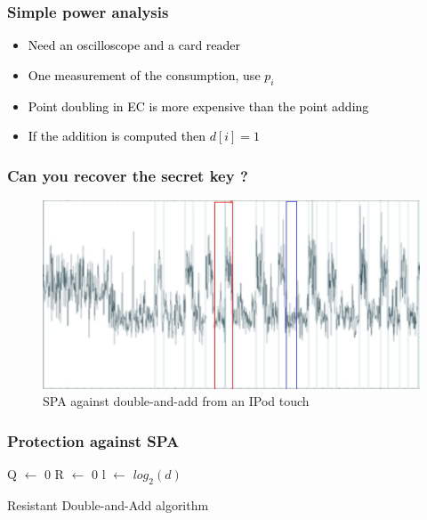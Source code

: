 \documentclass{beamer}
\begin{document}
\begin{frame}
    \frametitle{Simple power analysis}
    \begin{itemize}
        \item \textcolor{black} {Need an oscilloscope and a card reader}
	\item \textcolor{black} {One measurement of the consumption, use $p_{i}$} 
	\item \textcolor{black} {Point doubling in EC is more expensive than the point adding} 
	\item \textcolor{black} {If the addition is computed then $d[i] = 1$}
    \end{itemize}
\end{frame}

\begin{frame}
    \frametitle{Can you recover the secret key ?}
    \begin{figure}
        \centering
        \includegraphics[scale=0.6]{img/spa.png}
        \caption{SPA against double-and-add from an IPod touch}
    \end{figure}
\end{frame}

\begin{frame}
    \frametitle{Protection against SPA}
\begin{algorithm}[H]
    \footnotesize
    \SetAlgoLined %
   
    \SetSideCommentLeft 
    \SetNoFillComment

    
    
    Q $\leftarrow$ 0\;
    R $\leftarrow$ 0\;
    l $\leftarrow$ $log_2(d)$\;

    \bigskip

    \caption{Resistant Double-and-Add algorithm}
    \label{resistent-daa}
\end{algorithm}
\end{frame}
\end{document}
